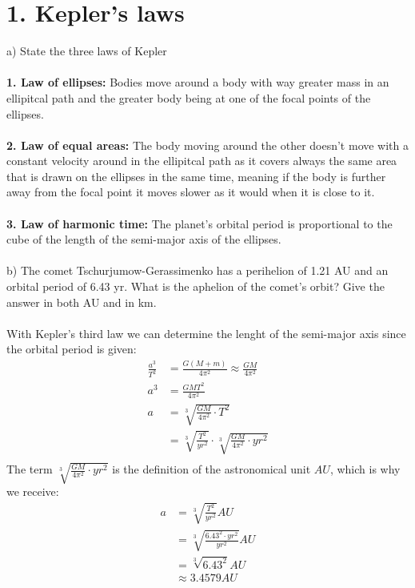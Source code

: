 \section*{1. Kepler's laws}

a) State the three laws of Kepler\\
\\
\textbf{1. Law of ellipses:} Bodies move around a body with way greater mass in an ellipitcal path and
the greater body being at one of the focal points of the ellipses.\\
\\
\textbf{2. Law of equal areas:} The body moving around the other doesn't move with a constant velocity 
around in the ellipitcal path as it covers always the same area that is drawn on the ellipses in the same 
time, meaning if the body is further away from the focal point it moves slower as it would when it is 
close to it.\\
\\
\textbf{3. Law of harmonic time:} The planet's orbital period is proportional to the cube of the length
of the semi-major axis of the ellipses.\\
\\
b) The comet Tschurjumow-Gerassimenko has a perihelion of 1.21 AU and an orbital period of 6.43 yr. What 
is the aphelion of the comet's orbit? Give the answer in both AU and in km.\\
\\
With Kepler's third law we can determine the lenght of the semi-major axis since the orbital period is 
given:
\begin{equation*}
    \begin{split}
        \frac{a^3}{T^2} &= \frac{G(M + m)}{4 \pi^2} \approx \frac{GM}{4 \pi^2}\\
        a^3 &= \frac{GMT^2}{4 \pi^2}\\
        a &= \sqrt[3]{\frac{GM}{4 \pi^2} \cdot T^2}\\
          &= \sqrt[3]{\frac{T^2}{yr^2}} \cdot \sqrt[3]{\frac{GM}{4 \pi^2} \cdot yr^2}\\
    \end{split}
\end{equation*}
The term $\sqrt[3]{\frac{GM}{4 \pi^2} \cdot yr^2}$ is the definition of the astronomical unit $AU$, which
is why we receive:
\begin{equation*}
    \begin{split}
        a &= \sqrt[3]{\frac{T^2}{yr^2}} AU\\
          &= \sqrt[3]{\frac{6.43^2 \cdot yr^2}{yr^2}} AU\\
          &= \sqrt[3]{6.43^2} AU\\
            &\approx 3.4579 AU\\
    \end{split}
\end{equation*}
